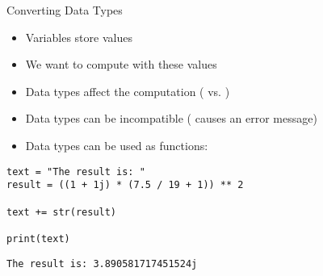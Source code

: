 
\begin{frame}[t,plain]
\titlepage
\end{frame}


\begin{frame}[fragile]{Converting Data Types}
%
\begin{itemize}
\item Variables store values
\item We want to compute with these values
\item Data types affect the computation ( vs. )
\item Data types can be incompatible ( causes an error message)
\item Data types can be used as functions:  \thus~ 
\end{itemize}
%
\begin{codebox}[Code: Data Type Conversion, width=.5\linewidth, nobeforeafter, equal height group = grpToString]
\begin{verbatim}
text = "The result is: "
result = ((1 + 1j) * (7.5 / 19 + 1)) ** 2

text += str(result)

print(text)
\end{verbatim}
\end{codebox}
%
\begin{cmdbox}[Output: Data Type Conversion, width=.49\linewidth, nobeforeafter, equal height group = grpToString]
\begin{verbatim}
The result is: 3.890581717451524j
\end{verbatim}
\end{cmdbox}
%
\end{frame}


